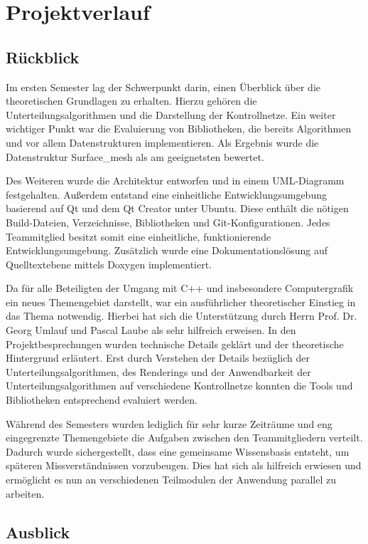 \chapter{Projektverlauf}

\section{Rückblick}

Im ersten Semester lag der Schwerpunkt darin, einen Überblick über die theoretischen Grundlagen zu erhalten. 
Hierzu gehören die Unterteilungsalgorithmen und die Darstellung der Kontrollnetze.
Ein weiter wichtiger Punkt war die Evaluierung von Bibliotheken, die bereits Algorithmen und vor allem Datenstrukturen implementieren. 
Als Ergebnis wurde die Datenstruktur Surface\_mesh als am geeignetsten bewertet.

Des Weiteren wurde die Architektur entworfen und in einem UML-Diagramm festgehalten.
Außerdem entstand eine einheitliche Entwicklungsumgebung basierend auf Qt und dem Qt Creator unter Ubuntu.
Diese enthält die nötigen Build-Dateien, Verzeichnisse, Bibliotheken und Git-Konfigurationen.
Jedes Teammitglied besitzt somit eine einheitliche, funktionierende Entwicklungsumgebung.
Zusätzlich wurde eine Dokumentationslösung auf Quelltextebene mittels Doxygen implementiert.

Da für alle Beteiligten der Umgang mit C++ und insbesondere Computergrafik ein neues Themengebiet darstellt, war ein ausführlicher theoretischer Einstieg in das Thema notwendig. 
Hierbei hat sich die Unterstützung durch Herrn Prof. Dr. Georg Umlauf und Pascal Laube als sehr hilfreich erweisen.
In den Projektbesprechungen wurden technische Details geklärt und der theoretische Hintergrund erläutert.
Erst durch Verstehen der Details bezüglich der Unterteilungsalgorithmen, des Renderings und der Anwendbarkeit der Unterteilungsalgorithmen auf verschiedene Kontrollnetze konnten die Tools und Bibliotheken entsprechend evaluiert werden.

Während des Semesters wurden lediglich für sehr kurze Zeiträume und eng eingegrenzte Themengebiete die Aufgaben zwischen den Teammitgliedern verteilt.
Dadurch wurde sichergestellt, dass eine gemeinsame Wissensbasis entsteht, um späteren Missverständnissen vorzubeugen.
Dies hat sich als hilfreich erwiesen und ermöglicht es nun an verschiedenen Teilmodulen der Anwendung parallel zu arbeiten.

\section{Ausblick}

